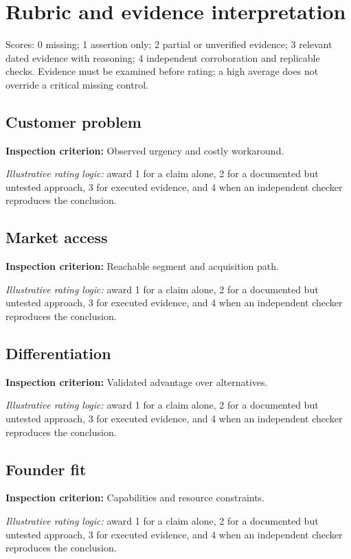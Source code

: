 \documentclass[11pt]{article}
\begin{document}
\SuiteOpen
\section{Rubric and evidence interpretation}
Scores: 0 missing; 1 assertion only; 2 partial or unverified evidence; 3 relevant dated evidence with reasoning; 4 independent corroboration and replicable checks. Evidence must be examined before rating; a high average does not override a critical missing control.
\subsection*{Customer problem}
\textbf{Inspection criterion:} Observed urgency and costly workaround.\par\textit{Illustrative rating logic:} award 1 for a claim alone, 2 for a documented but untested approach, 3 for executed evidence, and 4 when an independent checker reproduces the conclusion.\par
\subsection*{Market access}
\textbf{Inspection criterion:} Reachable segment and acquisition path.\par\textit{Illustrative rating logic:} award 1 for a claim alone, 2 for a documented but untested approach, 3 for executed evidence, and 4 when an independent checker reproduces the conclusion.\par
\subsection*{Differentiation}
\textbf{Inspection criterion:} Validated advantage over alternatives.\par\textit{Illustrative rating logic:} award 1 for a claim alone, 2 for a documented but untested approach, 3 for executed evidence, and 4 when an independent checker reproduces the conclusion.\par
\subsection*{Founder fit}
\textbf{Inspection criterion:} Capabilities and resource constraints.\par\textit{Illustrative rating logic:} award 1 for a claim alone, 2 for a documented but untested approach, 3 for executed evidence, and 4 when an independent checker reproduces the conclusion.\par
\end{document}
